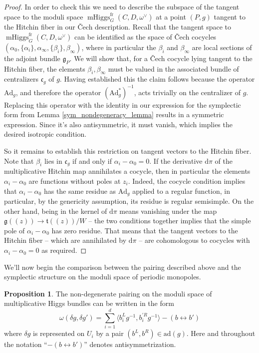 \documentclass[11pt, oneside, reqno]{amsart}
\theoremstyle{definition} \newtheorem{definition}{Definition}[section]
\newtheorem{prop}[definition]{Proposition}
\theoremstyle{definition} \newtheorem{remark}[definition]{Remark}
\theoremstyle{definition} \newtheorem{remarks}[definition]{Remarks}
\theoremstyle{definition} \newtheorem{question}[definition]{Question}
\theoremstyle{definition} \newtheorem*{note}{Note}
\theoremstyle{definition} \newtheorem{example}[definition]{Example}
\theoremstyle{definition} \newtheorem{examples}[definition]{Examples}
\renewcommand{\gg}{\mathfrak{g}}
\newcommand{\mr}[1]{\mathrm{#1}}
\newcommand{\mf}[1]{\mathfrak{#1}}
\DeclareMathOperator{\mhiggs}{mHiggs}
\renewcommand{\d}{\mathrm{d}}
\newcommand{\fr}{\mathrm{fr}}
\newcommand{\ad}{\mr{ad}}
\newcommand{\Ad}{\mr{Ad}}
\begin{document}
\begin{proof}
In order to check this we need to describe the subspace of the tangent space to the moduli space $\mhiggs^\fr_G(C,D,\omega^\vee)$ at a point $(P,g)$ tangent to the Hitchin fiber in our \v Cech description.  Recall that the tangent space to $\mhiggs^\fr_G(C,D,\omega^\vee)$ can be identified as the space of \v Cech cocycles $(\alpha_0, \{\alpha_i\}, \alpha_\infty, \{\beta_i\}, \beta_\infty)$, where in particular the $\beta_i$ and $\beta_\infty$ are local sections of the adjoint bundle $\gg_P$.  We will show that, for a \v Cech cocycle lying tangent to the Hitchin fiber, the elements $\beta_i, \beta_\infty$ must be valued in the associated bundle of centralizers $\mf c_g$ of $g$.  Having established this the claim follows because the operator $\Ad_g$, and therefore the operator $(\Ad_g^*)^{-1}$, acts trivially on the centralizer of $g$.  Replacing this operator with the identity in our expression for the symplectic form from Lemma \ref{sym_nondegeneracy_lemma} results in a symmetric expression.  Since it's also antisymmetric, it must vanish, which implies the desired isotropic condition.

So it remains to establish this restriction on tangent vectors to the Hitchin fiber.  Note that $\beta_i$ lies in $\mf c_g$ if and only if $\alpha_i - \alpha_0 = 0$.  If the derivative $\d \pi$ of the multiplicative Hitchin map annihilates a cocycle, then in particular the elements $\alpha_i - \alpha_0$ are functions without poles at $z_i$.  Indeed, the cocycle condition implies that $\alpha_i - \alpha_0$ has the same residue as $\Ad_g$ applied to a regular function, in particular, by the genericity assumption, its residue is regular semisimple.  On the other hand, being in the kernel of $\d \pi$ means vanishing under the map $\gg(\!(z)\!) \to \mf t(\!(z)\!)/W$ -- the two conditions together implies that the simple pole of $\alpha_i - \alpha_0$ has zero residue.  That means that the tangent vectors to the Hitchin fiber -- which are annihilated by $\d \pi$ -- are cohomologous to cocycles with $\alpha_i - \alpha_0 = 0$ as required.
\end{proof}

We'll now begin the comparison between the pairing described above and the symplectic structure on the moduli space of periodic monopoles.

\begin{prop} \label{qconn_symp_description}
The non-degenerate pairing on the moduli space of multiplicative Higgs bundles can be written in the form
\begin{equation}
\label{eq:resid}
\omega(\delta g, \delta g') = \sum_{i=1}^d \langle b_i^L g^{-1}, b^{'R}_i g^{-1} \rangle - (b \leftrightarrow b')
\end{equation}
where $\delta g$ is represented on $U_i$ by a pair $(b^L, b^R) \in \ad(g)$.  Here and throughout the notation ``$- (b \leftrightarrow b')$'' denotes antisymmetrization.
\end{prop}
\end{document}
